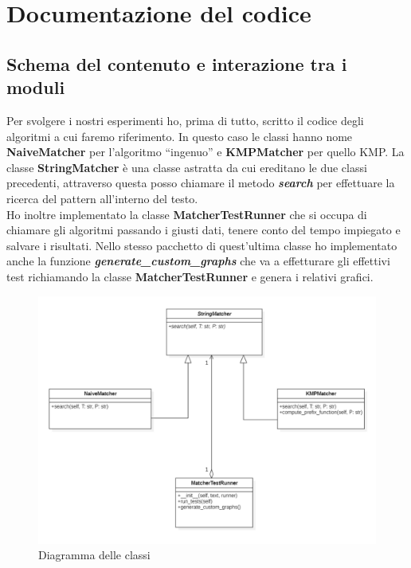 \documentclass{article}
\begin{document}
\newpage
\section{Documentazione del codice}
\subsection{Schema del contenuto e interazione tra i moduli}
Per svolgere i nostri esperimenti ho, prima di tutto, scritto il codice degli algoritmi a cui faremo riferimento. In questo caso le classi hanno nome \textbf{NaiveMatcher} per l'algoritmo ``ingenuo'' e \textbf{KMPMatcher} per quello KMP. La classe \textbf{StringMatcher} è una classe astratta da cui ereditano le due classi precedenti, attraverso questa posso chiamare il metodo \textbf{\textit{search}} per effettuare la ricerca del pattern all'interno del testo.\\
Ho inoltre implementato la classe \textbf{MatcherTestRunner} che si occupa di chiamare gli algoritmi passando i giusti dati, tenere conto del tempo impiegato e salvare i risultati. Nello stesso pacchetto di quest'ultima classe ho implementato anche la funzione \textbf{\textit{generate\_custom\_graphs}} che va a effetturare gli effettivi test richiamando la classe \textbf{MatcherTestRunner} e genera i relativi grafici.
\begin{figure}[H]
    \centering
    \includegraphics[width=1\textwidth]{img/UML.png}
    \caption{Diagramma delle classi}
    \label{fig:uml-diagram}
\end{figure}
\end{document}
